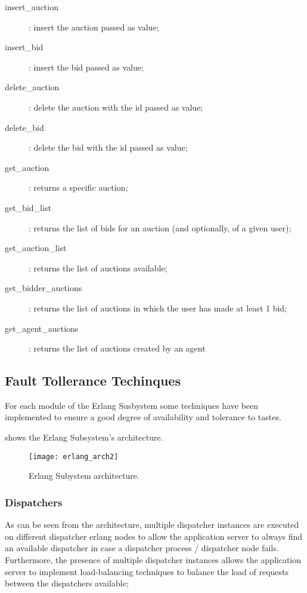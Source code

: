 \begin{description}
    \item [insert\_auction]: insert the auction passed as value;
    \item [insert\_bid]: insert the bid passed as value;
    \item [delete\_auction]: delete the auction with the id passed as value;
    \item [delete\_bid]: delete the bid with the id passed as value;
    \item [get\_auction]: returns a specific auction;
    \item [get\_bid\_list]: returns the list of bids for an auction (and
	    optionally, of a given user);
    \item [get\_auction\_list]: returns the list of auctions available;
    \item [get\_bidder\_auctions]: returns the list of auctions in which the
	    user has made at least 1 bid;
    \item [get\_agent\_auctions]: returns the list of auctions created by an
	    agent
\end{description}


\subsection{Fault Tollerance Techinques}
For each module of the Erlang Susbystem some techniques have been implemented to
ensure a good degree of availability and tolerance to tastes.

 shows the Erlang Subsystem's architecture.

\begin{figure}[H]
	\centering
	\texttt{[image: erlang\_arch2]}
	\caption{Erlang Subystem architecture.}\label{fig:erlang_arch2}
\end{figure}

\subsubsection{Dispatchers}

As can be seen from the architecture, multiple dispatcher instances are executed
on different dispatcher erlang nodes to allow the application server to always
find an available dispatcher in case a dispatcher process / dispatcher node
fails. Furthermore, the presence of multiple dispatcher instances allows the
application server to implement load-balancing techniques to balance the load of
requests between the dispatchers available;

